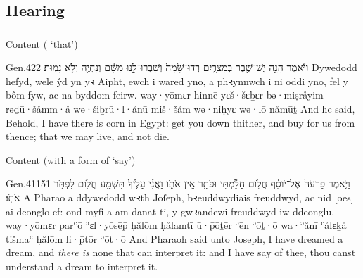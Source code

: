 \subsection{Hearing}




\subsubsection{}

\begin{frame}{\ex Content ( ‘that’)}
	\begin{example}{Gen.}{42}{2}{}{}
		\quoling
		{וַיֹּ֕אמֶר הִנֵּ֣ה   יֶשׁ־שֶׁ֖בֶר בְּמִצְרָ֑יִם רְדוּ־שָׁ֙מָּה֙ וְשִׁבְרוּ־לָ֣נוּ מִשָּׁ֔ם וְנִחְיֶ֖ה וְלֹ֥א נָמֽוּת׃}
		{Dywedodd hefyd, wele   ŷd yn yꝛ Aipht, ewch i wared yno, a phꝛynnwch i ni oddi yno, fel y bôm fyw, ac na byddom feirw.}
		{way·yōmɛr hinnē   yɛš·šɛḇɛr bə·miṣråyim rəḏū·šåmm·å wə·šiḇrū·l·ånū miš·šåm wə·niḥyɛ wə·lō nåmūṯ}
		{And he said, Behold, I have   there is corn in Egypt: get you down thither, and buy for us from thence; that we may live, and not die.}
	\end{example}
\end{frame}

\begin{frame}{\ex Content (with a form of  ‘say’)}
	\begin{example}{Gen.}{41}{15}{1}{}
		\quoling
		{וַיֹּ֤אמֶר פַּרְעֹה֙ אֶל־יֹוסֵ֔ף חֲלֹ֣ום חָלַ֔מְתִּי וּפֹתֵ֖ר אֵ֣ין אֹתֹ֑ו וַאֲנִ֗י  עָלֶ֙יךָ֙  תִּשְׁמַ֥ע חֲלֹ֖ום לִפְתֹּ֥ר אֹתֹֽו׃}
		{A Pharao a ddywedodd wꝛth Joſeph, bꝛeuddwydiais freuddwyd, ac nid [oes] ai deonglo ef: ond myfi a   am danat ti, y gwꝛandewi freuddwyd iw ddeonglu.}
		{way·yōmɛr parʿō ʾɛl·yōsēp̄ ḥălōm ḥålamtī ū·p̄ōṯēr ʾēn ʾōṯ·ō wa·ʾănī  ʿålɛḵå  tišmaʿ ḥălōm li·p̄tōr ʾōṯ·ō}
		{And Pharaoh said unto Joseph, I have dreamed a dream, and \emph{there is} none that can interpret it: and I have  say of thee,  thou canst understand a dream to interpret it.}
	\end{example}
\end{frame}



\subsubsection{}

